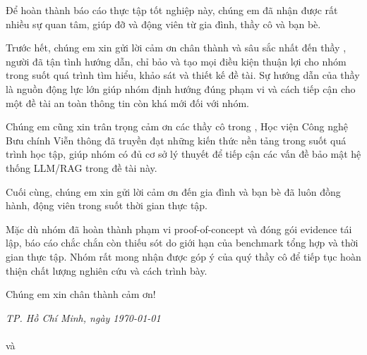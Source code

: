 \begin{acknowledgments}
\setlength{\parskip}{6pt}
Để hoàn thành báo cáo thực tập tốt nghiệp này, chúng em đã nhận được rất nhiều sự quan tâm, giúp đỡ và động viên từ gia đình, thầy cô và bạn bè.

Trước hết, chúng em xin gửi lời cảm ơn chân thành và sâu sắc nhất đến thầy \textbf{\supervisor}, người đã tận tình hướng dẫn, chỉ bảo và tạo mọi điều kiện thuận lợi cho nhóm trong suốt quá trình tìm hiểu, khảo sát và thiết kế đề tài. Sự hướng dẫn của thầy là nguồn động lực lớn giúp nhóm định hướng đúng phạm vi và cách tiếp cận cho một đề tài an toàn thông tin còn khá mới đối với nhóm.

Chúng em cũng xin trân trọng cảm ơn các thầy cô trong \faculty, Học viện Công nghệ Bưu chính Viễn thông đã truyền đạt những kiến thức nền tảng trong suốt quá trình học tập, giúp nhóm có đủ cơ sở lý thuyết để tiếp cận các vấn đề bảo mật hệ thống LLM/RAG trong đề tài này.

Cuối cùng, chúng em xin gửi lời cảm ơn đến gia đình và bạn bè đã luôn đồng hành, động viên trong suốt thời gian thực tập.

Mặc dù nhóm đã hoàn thành phạm vi proof-of-concept và đóng gói evidence tái lập,
báo cáo chắc chắn còn thiếu sót do giới hạn của benchmark tổng hợp và thời gian
thực tập. Nhóm rất mong nhận được góp ý của quý thầy cô để tiếp tục hoàn thiện
chất lượng nghiên cứu và cách trình bày.

Chúng em xin chân thành cảm ơn!

\vspace{2cm}
\begin{flushright}
    \textit{TP. Hồ Chí Minh, ngày \today} \\
     \\[2.5cm]

    \textbf{\studentname} và \textbf{\studentnametwo}\\
\end{flushright}
\end{acknowledgments}
